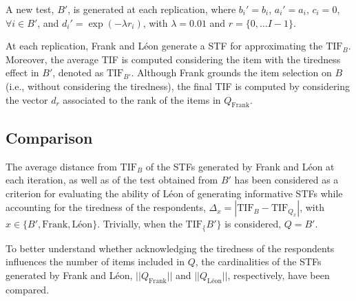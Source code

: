 \documentclass{svproc}
\begin{document}
\color{blue}
A new test, $B'$, is generated at each replication, where $b_i' = b_i$, $a_i' = a_i$, $c_i = 0$, $\forall i \in B'$, and $d_i' = \exp(-\lambda r_i)$, with $\lambda = 0.01$ and $r = \{0, \ldots I -1\}$.

At each replication, Frank and Léon generate a STF for approximating the $\text{TIF}_B$. Moreover, the average TIF is computed considering the item with the tiredness effect in $B'$, denoted as $\text{TIF}_{B'}$.
Although Frank grounds the item selection on $B$ (i.e., without considering the tiredness), the final TIF is computed by considering the vector $d_r$ associated to the rank of the items in $Q_{\text{Frank}}$.
\normalcolor


\subsection{Comparison}

The average distance from $\text{TIF}_B$ of the STFs generated by Frank and Léon at each iteration, as well as of the test obtained from $B'$ has been considered as a criterion for evaluating the ability of Léon of generating informative STFs while accounting for the tiredness of the respondents, $\Delta_x = |\text{TIF}_B - \text{TIF}_{Q_x}|$, with $x \in \{B', \text{Frank}, \text{Léon}\}$.  Trivially, when the $\text{TIF}_\{B'\}$ is considered, $Q = B'$.

To better understand whether acknowledging the tiredness of the respondents influences the number of items included in $Q$, the cardinalities of the STFs generated by Frank and Léon, $||Q_{\text{Frank}}||$ and $||Q_{\text{Léon}}||$, respectively, have been compared. 

  
\end{document}
